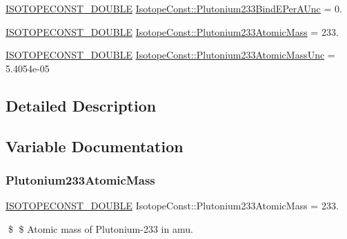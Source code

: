 \begin{DoxyCompactItemize}
\mbox{\hyperlink{group___isotope_const-_macros_ga8f45a7272ce02c0b4c65c44636ed719a}{I\+S\+O\+T\+O\+P\+E\+C\+O\+N\+S\+T\+\_\+\+D\+O\+U\+B\+LE}} \mbox{\hyperlink{group___isotope_const-_plutonium-_pu233_ga235febee8d4ada631d51806300c70d4b}{Isotope\+Const\+::\+Plutonium233\+Bind\+E\+Per\+A\+Unc}} = 0.
\item 
\mbox{\hyperlink{group___isotope_const-_macros_ga8f45a7272ce02c0b4c65c44636ed719a}{I\+S\+O\+T\+O\+P\+E\+C\+O\+N\+S\+T\+\_\+\+D\+O\+U\+B\+LE}} \mbox{\hyperlink{group___isotope_const-_plutonium-_pu233_ga4c3c1db80d5e4cfb8b72d6e9c85f8b65}{Isotope\+Const\+::\+Plutonium233\+Atomic\+Mass}} = 233.
\item 
\mbox{\hyperlink{group___isotope_const-_macros_ga8f45a7272ce02c0b4c65c44636ed719a}{I\+S\+O\+T\+O\+P\+E\+C\+O\+N\+S\+T\+\_\+\+D\+O\+U\+B\+LE}} \mbox{\hyperlink{group___isotope_const-_plutonium-_pu233_gaff07dfd8bf09260c069d9e2d49513c75}{Isotope\+Const\+::\+Plutonium233\+Atomic\+Mass\+Unc}} = 5.\+4054e-\/05
\end{DoxyCompactItemize}


\subsection{Detailed Description}


\subsection{Variable Documentation}
\mbox{\label{group___isotope_const-_plutonium-_pu233_ga4c3c1db80d5e4cfb8b72d6e9c85f8b65}} 
\subsubsection{\texorpdfstring{Plutonium233\+Atomic\+Mass}{Plutonium233AtomicMass}}
{\footnotesize\ttfamily \mbox{\hyperlink{group___isotope_const-_macros_ga8f45a7272ce02c0b4c65c44636ed719a}{I\+S\+O\+T\+O\+P\+E\+C\+O\+N\+S\+T\+\_\+\+D\+O\+U\+B\+LE}} Isotope\+Const\+::\+Plutonium233\+Atomic\+Mass = 233.}

\$ \$ Atomic mass of Plutonium-\/233 in amu. \mbox{\label{group___isotope_const-_plutonium-_pu233_gaff07dfd8bf09260c069d9e2d49513c75}} 
